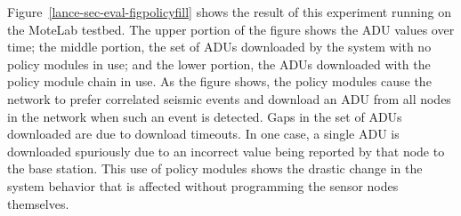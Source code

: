 Figure~\ref{lance-sec-eval-figpolicyfill} shows the result of this experiment
running on the MoteLab testbed. The upper portion of the figure shows the ADU
values over time; the middle portion, the set of ADUs downloaded by the
system with no policy modules in use; and the lower portion, the ADUs
downloaded with the policy module chain in use. As the figure shows, the
policy modules cause the network to prefer correlated seismic events and
download an ADU from all nodes in the network when such an event is detected.
Gaps in the set of ADUs downloaded are due to download timeouts. In one case,
a single ADU is downloaded spuriously due to an incorrect value being
reported by that node to the base station. This use of policy modules shows
the drastic change in the system behavior that is affected without
programming the sensor nodes themselves.




